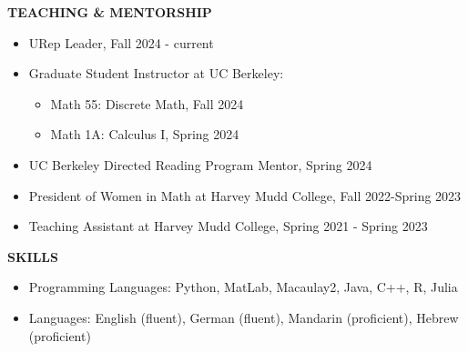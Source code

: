 \documentclass[11pt]{article}
\newcommand{\hdr}[1]{\textcolor{blue(ryb)}{\textbf{#1}}}
\begin{document}
\bigskip


\hdr{TEACHING \& MENTORSHIP}\\
\begin{itemize}
\item URep Leader, Fall 2024 - current
\item Graduate Student Instructor at UC Berkeley:
  \begin{itemize}
  \item Math 55: Discrete Math, Fall 2024
  \item Math 1A: Calculus I, Spring 2024
  \end{itemize}
\item UC Berkeley Directed Reading Program Mentor, Spring 2024
\item President of Women in Math at Harvey Mudd College, Fall 2022-Spring 2023
\item Teaching Assistant at Harvey Mudd College, Spring 2021 - Spring 2023
\end{itemize}

\bigskip

\hdr{SKILLS}\\
\begin{itemize}
\item 
Programming Languages: Python, MatLab, Macaulay2, Java, C++, R, Julia\\
\item 
Languages: English (fluent), German (fluent), Mandarin (proficient), Hebrew (proficient)
\end{itemize}
\end{document}
